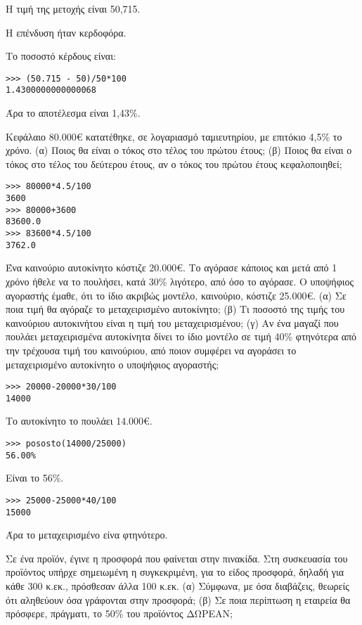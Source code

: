 Η τιμή της μετοχής είναι 50,715.

Η επένδυση ήταν κερδοφόρα.

Το ποσοστό κέρδους είναι:
\begin{lstlisting}
>>> (50.715 - 50)/50*100
1.4300000000000068
\end{lstlisting}

Άρα το αποτέλεσμα είναι 1,43\%.

\begin{exercise}
Κεφάλαιο 80.000€ κατατέθηκε, σε λογαριασμό ταμιευτηρίου, με επιτόκιο 4,5\% το χρόνο.
(α) Ποιος θα είναι ο τόκος στο τέλος του πρώτου έτους; (β) Ποιος θα είναι ο τόκος
στο τέλος του δεύτερου έτους, αν ο τόκος του πρώτου έτους κεφαλοποιηθεί;
\end{exercise}

\begin{lstlisting}
>>> 80000*4.5/100
3600
>>> 80000+3600
83600.0
>>> 83600*4.5/100
3762.0
\end{lstlisting}

\begin{exercise}
Ένα καινούριο αυτοκίνητο κόστιζε 20.000€. Το αγόρασε κάποιος και μετά από 1
χρόνο ήθελε να το πουλήσει, κατά 30\% λιγότερο, από όσο το αγόρασε. Ο υποψήφιος
αγοραστής έμαθε, ότι το ίδιο ακριβώς μοντέλο, καινούριο, κόστιζε 25.000€. (α) Σε
ποια τιμή θα αγόραζε το μεταχειρισμένο αυτοκίνητο; (β) Τι ποσοστό της τιμής του
καινούριου αυτοκινήτου είναι η τιμή του μεταχειρισμένου; (γ) Αν ένα μαγαζί που πουλάει
μεταχειρισμένα αυτοκίνητα δίνει το ίδιο μοντέλο σε τιμή 40\% φτηνότερα από την
τρέχουσα τιμή του καινούριου, από ποιον συμφέρει να αγοράσει το μεταχειρισμένο
αυτοκίνητο ο υποψήφιος αγοραστής;
\end{exercise}

\begin{lstlisting}
>>> 20000-20000*30/100
14000
\end{lstlisting}
Το αυτοκίνητο το πουλάει 14.000€.

\begin{lstlisting}
>>> pososto(14000/25000)
56.00%
\end{lstlisting}

Είναι το 56\%.

\begin{lstlisting}
>>> 25000-25000*40/100
15000
\end{lstlisting}

Άρα το μεταχειρισμένο είνα φτηνότερο.

\begin{exercise}
Σε ένα προϊόν, έγινε η προσφορά που φαίνεται στην πινακίδα. Στη
συσκευασία του προϊόντος υπήρχε σημειωμένη η συγκεκριμένη, για το
είδος προσφορά, δηλαδή για κάθε 300 κ.εκ., πρόσθεσαν άλλα 100 κ.εκ.
(α) Σύμφωνα, με όσα διαβάζεις, θεωρείς ότι αληθεύουν όσα γράφονται
στην προσφορά; (β) Σε ποια περίπτωση η εταιρεία θα πρόσφερε,
πράγματι, το 50\% του προϊόντος ΔΩΡΕΑΝ;
\end{exercise}

